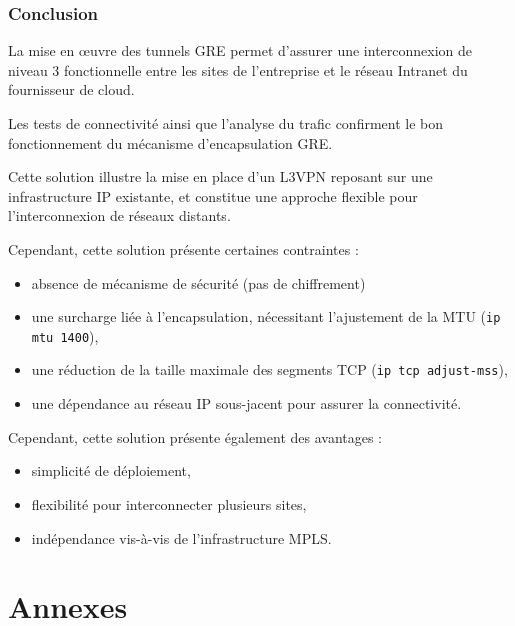 \documentclass[12pt,a4paper, oneside]{memoir}
\begin{document}
\subsection{Conclusion}

La mise en œuvre des tunnels GRE permet d’assurer une interconnexion de niveau 3 fonctionnelle entre les sites de l’entreprise et le réseau Intranet du fournisseur de cloud.

Les tests de connectivité ainsi que l’analyse du trafic confirment le bon fonctionnement du mécanisme d’encapsulation GRE.

Cette solution illustre la mise en place d’un L3VPN reposant sur une infrastructure IP existante, et constitue une approche flexible pour l’interconnexion de réseaux distants.

Cependant, cette solution présente certaines contraintes :

\begin{itemize}
	\item absence de mécanisme de sécurité (pas de chiffrement)
	\item une surcharge liée à l’encapsulation, nécessitant l’ajustement de la MTU (\texttt{ip mtu 1400}),
	\item une réduction de la taille maximale des segments TCP (\texttt{ip tcp adjust-mss}),
	\item une dépendance au réseau IP sous-jacent pour assurer la connectivité.
\end{itemize}

Cependant, cette solution présente également des avantages :

\begin{itemize}
	\item simplicité de déploiement,
	\item flexibilité pour interconnecter plusieurs sites,
	\item indépendance vis-à-vis de l’infrastructure MPLS.
\end{itemize}

\chapter{Annexes}
\end{document}
